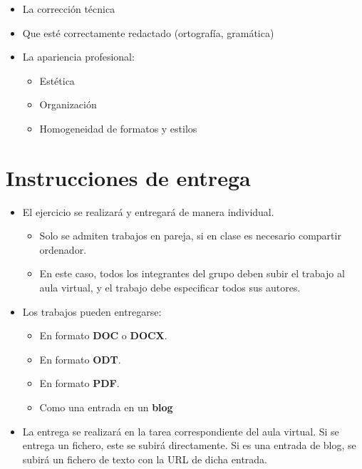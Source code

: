 \begin{itemize}
\item La corrección técnica 
\item Que esté correctamente redactado (ortografía, gramática)
\item La apariencia profesional:
  \begin{itemize}
  \item Estética
  \item Organización
  \item Homogeneidad de formatos y estilos
  \end{itemize}
\end{itemize}

\section{Instrucciones de entrega}
\begin{itemize}
\item El ejercicio se realizará y entregará de manera individual.
  \begin{itemize}
  \item Solo se admiten trabajos en pareja, si en clase es necesario compartir ordenador.
  \item En este caso, todos los integrantes del grupo deben subir el trabajo al aula virtual, y el trabajo debe especificar todos sus autores.
  \end{itemize}

\item Los trabajos pueden entregarse:
  \begin{itemize}
  \item En formato \textbf{DOC} o \textbf{DOCX}.
  \item En formato \textbf{ODT}.
  \item En formato \textbf{PDF}. 
  \item Como una entrada en un \textbf{blog} 

  \end{itemize}
  
\item La entrega se realizará en la tarea correspondiente del aula virtual. Si se entrega un fichero, este se subirá directamente. Si es una entrada de blog, se subirá un fichero de texto con la URL de dicha entrada.
\end{itemize}  


\begin{comment}
\url{https://networkengineering.stackexchange.com/questions/5300/what-is-the-difference-between-ethernet-ii-and-802-3-ethernet}
\url{https://en.wikipedia.org/wiki/IEEE_802.3}
\end{comment}



